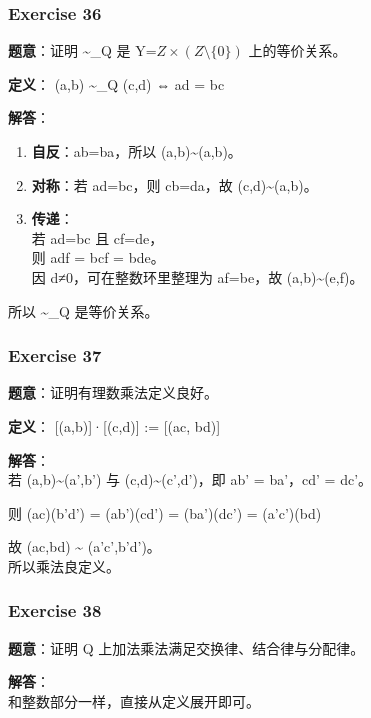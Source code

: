 \documentclass[
  11pt,
]{article}
\providecommand{\tightlist}{%
  \setlength{\itemsep}{0pt}\setlength{\parskip}{0pt}}
\begin{document}
\subsubsection{Exercise 36}\label{exercise-36}

\textbf{题意}：证明 \textasciitilde\_Q 是
Y=\(Z\times (Z\setminus\{0\})\) 上的等价关系。

\textbf{定义}： (a,b) \textasciitilde\_Q (c,d) ⇔ ad = bc

\textbf{解答}：

\begin{enumerate}
\def\labelenumi{\arabic{enumi}.}
\tightlist
\item
  \textbf{自反}：ab=ba，所以 (a,b)\textasciitilde(a,b)。
\item
  \textbf{对称}：若 ad=bc，则 cb=da，故 (c,d)\textasciitilde(a,b)。
\item
  \textbf{传递}：\\
  若 ad=bc 且 cf=de，\\
  则 adf = bcf = bde。\\
  因 d≠0，可在整数环里整理为 af=be，故 (a,b)\textasciitilde(e,f)。
\end{enumerate}

所以 \textasciitilde\_Q 是等价关系。

\subsubsection{Exercise 37}\label{exercise-37}

\textbf{题意}：证明有理数乘法定义良好。

\textbf{定义}： {[}(a,b){]}·{[}(c,d){]} := {[}(ac, bd){]}

\textbf{解答}：\\
若 (a,b)\textasciitilde(a',b') 与 (c,d)\textasciitilde(c',d')，即 ab' =
ba'，cd' = dc'。

则 (ac)(b'd') = (ab')(cd') = (ba')(dc') = (a'c')(bd)

故 (ac,bd) \textasciitilde{} (a'c',b'd')。\\
所以乘法良定义。

\subsubsection{Exercise 38}\label{exercise-38}

\textbf{题意}：证明 Q 上加法乘法满足交换律、结合律与分配律。

\textbf{解答}：\\
和整数部分一样，直接从定义展开即可。
\end{document}
